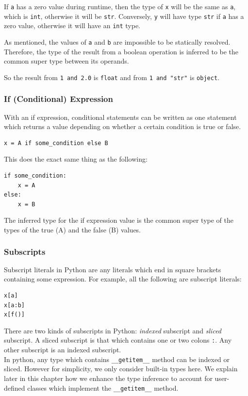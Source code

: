 If \lstinline|a| has a zero value during runtime, then the type of \lstinline|x| will be the same as \lstinline|a|, which is \lstinline|int|, otherwise it will be \lstinline|str|. Conversely, \lstinline|y| will have type \lstinline|str| if \lstinline|a| has a zero value, otherwise it will have an \lstinline|int| type.

As mentioned, the values of \lstinline|a| and \lstinline|b| are impossible to be statically resolved. Therefore, the type of the result from a boolean operation is inferred to be the common super type between its operands.

So the result from \lstinline|1 and 2.0| is \lstinline|float| and from \lstinline|1 and "str"| is \lstinline|object|.

\subsubsection{If (Conditional) Expression}
With an if expression, conditional statements can be written as one statement which returns a value depending on whether a certain condition is true or false.
\begin{lstlisting}
x = A if some_condition else B
\end{lstlisting}
This does the exact same thing as the following:
\begin{lstlisting}
if some_condition:
	x = A
else:
	x = B
\end{lstlisting}

The inferred type for the if expression value is the common super type of the types of the true (A) and the false (B) values.

\subsubsection{Subscripts}
Subscript literals in Python are any literals which end in square brackets containing some expression. For example, all the following are subscript literals:
\begin{lstlisting}
x[a]
x[a:b]
x[f()]
\end{lstlisting}

There are two kinds of subscripts in Python: \textit{indexed} subscript and \textit{sliced} subscript. A sliced subscript is that which contains one or two colons \lstinline|:|. Any other subscript is an indexed subscript. \\

In python, any type which contains \lstinline|__getitem__| method can be indexed or sliced. However for simplicity, we only consider built-in types here. We explain later in this chapter how we enhance the type inference to account for user-defined classes which implement the \lstinline|__getitem__| method. \\

